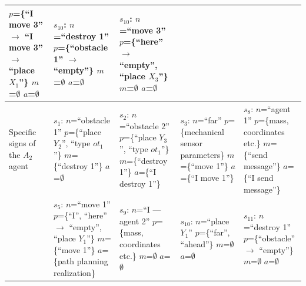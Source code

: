 \documentclass[runningheads,a4paper]{llncs}
\begin{document}
\begin{table}
\begin{tabular}{| p{1.5cm} | p{2.2cm} | p{2.2cm} | p{2.2cm} | p{2.2cm} |}
		$p$=\{``I move 3'' $\rightarrow$ ``I move 3'' $\rightarrow$ ``place $X_1$''\}\newline
		$m$=$\emptyset$\newline
		$a$=$\emptyset$
		&
		$s_{10}$: $n$=``destroy 1''\newline
		$p$=\{``obstacle 1'' $\rightarrow$ ``empty''\}\newline
		$m$=$\emptyset$\newline
		$a$=$\emptyset$
		&
		$s_{10}$: $n$=``move 3''\newline
		$p$=\{``here'' $\rightarrow$ ``empty'', ``place $X_3$''\}\newline
		$m$=$\emptyset$\newline
		$a$=$\emptyset$
		&
		
		\\ \hline
		Specific signs of the $A_2$ agent
		&
		$s_1$: $n$=``obstacle 1''\newline
		$p$=\{``place $Y_2$'', ``type $ot_1$''\}\newline
		$m$=\{``destroy 1''\}\newline
		$a$=$\emptyset$
		&
		$s_2$: $n$=``obstacle 2''\newline
		$p$=\{``place $Y_3$'', ``type $ot_1$''\}\newline
		$m$=\{``destroy 1''\}\newline
		$a$=\{``I destroy 1''\}
		&
		$s_3$: $n$=``far''\newline
		$p$=\{mechanical sensor parameters\}\newline
		$m$=\{``move 1''\}\newline
		$a$=\{``I move 1''\}	
		&
		$s_8$: $n$=``agent 1''\newline
		$p$=\{mass, coordinates etc.\}\newline
		$m$=\{``send message''\}\newline
		$a$=\{``I send message''\}
		\\\cline{2-5}
		&
		$s_5$: $n$=``move 1''\newline
		$p$=\{``I'', ``here'' $\rightarrow$ ``empty'', ``place $Y_1$''\}\newline
		$m$=\{``move 1''\}\newline
		$a$=\{path planning realization\}	
		&
		$s_9$: $n$=``I --- agent 2''\newline
		$p$=\{mass, coordinates etc.\}\newline
		$m$=$\emptyset$\newline
		$a$=$\emptyset$
		&
		$s_{10}$: $n$=``place $Y_1$''\newline
		$p$=\{``far'', ``ahead''\}\newline
		$m$=$\emptyset$\newline
		$a$=$\emptyset$	
		&
		$s_{11}$: $n$=``destroy 1''\newline
		$p$=\{``obstacle'' $\rightarrow$ ``empty''\}\newline
		$m$=$\emptyset$\newline
		$a$=$\emptyset$	
		\\\hline
	\end{tabular}
\end{table}
\end{document}
